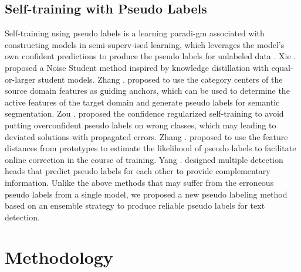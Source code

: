 \subsection{Self-training with Pseudo Labels}
Self-training using pseudo labels is a learning paradi-gm associated with constructing models in semi-superv-ised learning, which leverages the model’s own confident predictions to produce the pseudo labels for unlabeled data \citep{noisestudent,cag,zhang2021towards}. Xie  . \citep{noisestudent} proposed a Noise Student method inspired by knowledge distillation with equal-or-larger student models. Zhang  . \citep{cag} proposed to use the category centers of the source domain features as guiding anchors, which can be used to determine the active features of the target domain and generate pseudo labels for semantic segmentation. Zou  . \citep{crst} proposed the confidence regularized self-training to avoid putting overconfident pseudo labels on wrong classes, which may leading to deviated solutions with propagated errors. Zhang  . \citep{prototypical} proposed to use the feature distances from prototypes to estimate the likelihood of pseudo labels to facilitate online correction in the course of training. Yang  . \citep{interactive} designed multiple detection heads that predict pseudo labels for each other to provide complementary information. Unlike the above methods that may suffer from the erroneous pseudo labels from a single model, we proposed a new pseudo labeling method based on an ensemble strategy to produce reliable pseudo labels for text detection.



\section{Methodology}

